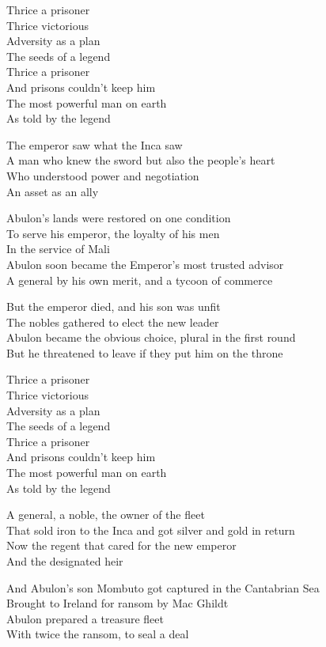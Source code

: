 \begin{lyrics}
Thrice a prisoner\\
Thrice victorious\\
Adversity as a plan\\
The seeds of a legend\\
Thrice a prisoner\\
And prisons couldn’t keep him\\
The most powerful man on earth\\
As told by the legend

The emperor saw what the Inca saw\\
A man who knew the sword but also the people’s heart\\
Who understood power and negotiation\\
An asset as an ally

Abulon’s lands were restored on one condition\\
To serve his emperor, the loyalty of his men\\
In the service of Mali\\
Abulon soon became the Emperor’s most trusted advisor\\
A general by his own merit, and a tycoon of commerce

But the emperor died, and his son was unfit\\
The nobles gathered to elect the new leader\\
Abulon became the obvious choice, plural in the first round\\
But he threatened to leave if they put him on the throne

Thrice a prisoner\\
Thrice victorious\\
Adversity as a plan\\
The seeds of a legend\\
Thrice a prisoner\\
And prisons couldn’t keep him\\
The most powerful man on earth\\
As told by the legend

A general, a noble, the owner of the fleet\\
That sold iron to the Inca and got silver and gold in return\\
Now the regent that cared for the new emperor\\
And the designated heir

And Abulon’s son Mombuto got captured in the Cantabrian Sea\\
Brought to Ireland for ransom by Mac Ghildt\\
Abulon prepared a treasure fleet\\
With twice the ransom, to seal a deal


\end{lyrics}
